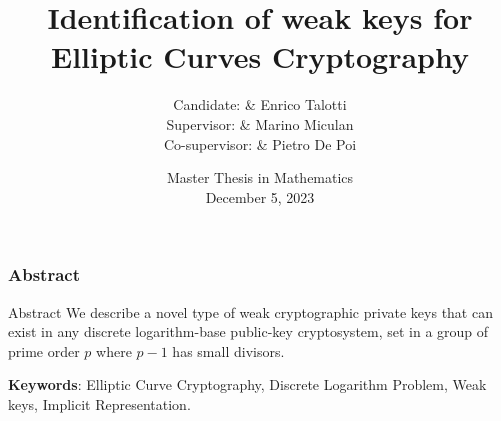 \documentclass[
	11pt, %
]{beamer}
\title[Weak keys ECC]{Identification of weak keys for Elliptic Curves Cryptography} %
\author[Enrico Talotti]{%
	Candidate: & Enrico Talotti \\
	Supervisor: & Marino Miculan\\
	Co-supervisor: & Pietro De Poi
}
\institute[UniUd]{Università degli Studi di Udine} %
\date[Dec 5, 2023]{Master Thesis in Mathematics \\ December 5, 2023} %
\theoremstyle{definition}
\theoremstyle{remark}
\begin{document}

\begin{frame}
	\titlepage %
\end{frame}



\begin{frame}
	\frametitle{Abstract} %
	\begin{block}{\centering Abstract}
		We describe a novel type of weak cryptographic private keys that can exist in any discrete logarithm-base public-key cryptosystem, set in a group of prime order $p$ where $p-1$ has small divisors.
\end{block}

\textbf{Keywords}: Elliptic Curve Cryptography, Discrete Logarithm Problem, Weak keys, Implicit Representation.



\nocite{Pra1}
\nocite{Pra2}
\nocite{repo}


\end{frame}
\end{document}
